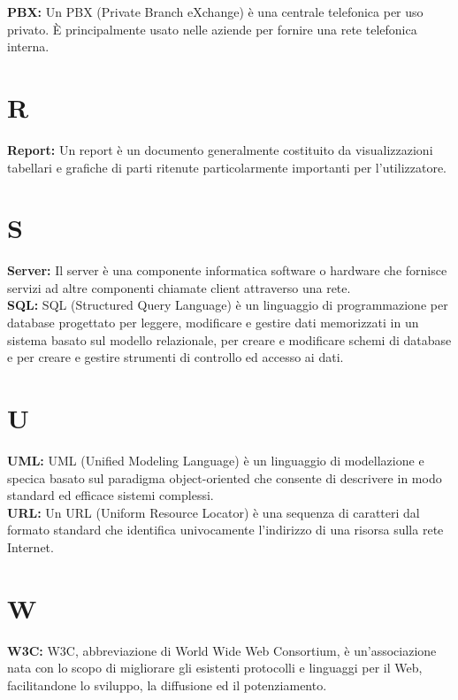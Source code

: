 {\hypertarget{pbx}{}
\noindent
\textbf{PBX:}
Un PBX (Private Branch eXchange) \`e una centrale telefonica per uso privato. \`E principalmente usato nelle aziende per fornire una rete telefonica interna.

\section*{R}
\hypertarget{report}{}
\textbf{Report:}
Un report \`e un documento generalmente costituito da visualizzazioni tabellari e grafiche di parti ritenute particolarmente importanti per l'utilizzatore.

\section*{S}
\hypertarget{server}{}
\textbf{Server:}
Il server \`e una componente informatica software o hardware che fornisce servizi ad altre componenti chiamate client attraverso una rete. \\


\hypertarget{sql}{}
\noindent
\textbf{SQL:}
SQL (Structured Query Language) \`e un linguaggio di programmazione per database progettato per leggere, modificare e gestire dati memorizzati in un sistema basato sul modello relazionale, per creare e modificare schemi di database e per creare e gestire strumenti di controllo ed accesso ai dati.\\

\section*{U}
\hypertarget{uml}{}
\textbf{UML:}
UML (Unified Modeling Language) \`e un  linguaggio di modellazione e specica basato sul paradigma object-oriented che consente di descrivere in modo standard ed efficace sistemi complessi.\\

\hypertarget{url}{}
\noindent 
\textbf{URL:}
Un URL (Uniform Resource Locator) \`e una sequenza di caratteri dal formato standard che identifica univocamente l'indirizzo di una risorsa sulla rete Internet.

\section*{W}
\hypertarget{w3c}{}
\textbf{W3C:}
W3C, abbreviazione di World Wide Web Consortium, \`e un'associazione nata con lo scopo di migliorare gli esistenti protocolli e linguaggi per il Web, facilitandone lo sviluppo, la diffusione ed il potenziamento.

}
